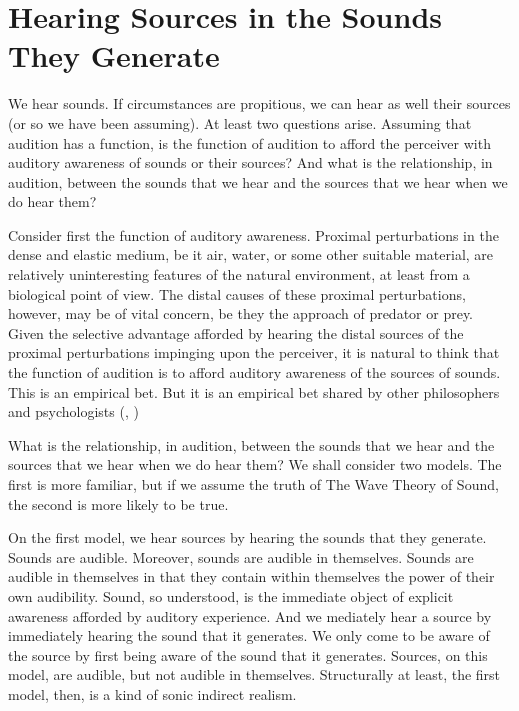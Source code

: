 \documentclass[12pt]{article}
\begin{document}

\section{Hearing Sources in the Sounds They Generate} %
\label{sec:hearing_sources_in_the_sounds_they_generate}

We hear sounds. If circumstances are propitious, we can hear as well their sources (or so we have been assuming). At least two questions arise. Assuming that audition has a function, is the function of audition to afford the perceiver with auditory awareness of sounds or their sources? And what is the relationship, in audition, between the sounds that we hear and the sources that we hear when we do hear them?

Consider first the function of auditory awareness. Proximal perturbations in the dense and elastic medium, be it air, water, or some other suitable material, are relatively uninteresting features of the natural environment, at least from a biological point of view. The distal causes of these proximal perturbations, however, may be of vital concern, be they the approach of predator or prey. Given the selective advantage afforded by hearing the distal sources of the proximal perturbations impinging upon the perceiver, it is natural to think that the function of audition is to afford auditory awareness of the sources of sounds. This is an empirical bet. But it is an empirical bet shared by other philosophers and psychologists (\citealt{Nudds:2009sf}, \citealt{Bregman:1990aa})

What is the relationship, in audition, between the sounds that we hear and the sources that we hear when we do hear them? We shall consider two models. The first is more familiar, but if we assume the truth of The Wave Theory of Sound, the second is more likely to be true. 

On the first model, we hear sources by hearing the sounds that they generate. Sounds are audible. Moreover, sounds are audible in themselves. Sounds are audible in themselves in that they contain within themselves the power of their own audibility. Sound, so understood, is the immediate object of explicit awareness afforded by auditory experience. And we mediately hear a source by immediately hearing the sound that it generates. We only come to be aware of the source by first being aware of the sound that it generates. Sources, on this model, are audible, but not audible in themselves. Structurally at least, the first model, then, is a kind of sonic indirect realism.
\end{document}
